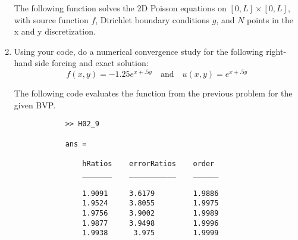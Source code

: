\documentclass[11pt, oneside, titlepage]{article}
\begin{document}
\begin{enumerate}
        The following function solves the 2D Poisson equations on
        $[0,L] \times [0, L]$, with source function $f$, Dirichlet boundary
        conditions $g$, and $N$ points in the x and y discretization.
        

    \item %
        Using your code, do a numerical convergence study for the following
        right-hand side forcing and exact solution:
        \[
            f(x,y) = -1.25e^{x + .5y}\quad\text{and}\quad u(x,y) = e^{x + .5y}
        \]

        The following code evaluates the function from the previous problem
        for the given BVP.
        
        \begin{verbatim}
            >> H02_9

            ans = 

                hRatios    errorRatios    order 
                _______    ___________    ______

                1.9091     3.6179         1.9886
                1.9524     3.8055         1.9975
                1.9756     3.9002         1.9989
                1.9877     3.9498         1.9996
                1.9938      3.975         1.9999
        \end{verbatim}
\end{enumerate}
\end{document}
